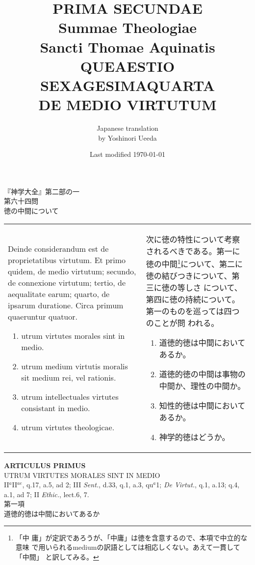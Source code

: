 \documentclass[10pt]{jsarticle}
\title{{\bf PRIMA SECUNDAE}\\{\HUGE Summae Theologiae}\\Sancti Thomae
Aquinatis\\{\sffamily QUEAESTIO SEXAGESIMAQUARTA}\\DE MEDIO VIRTUTUM}
\author{Japanese translation\\by Yoshinori {\sc Ueeda}}
\date{Last modified \today}
\begin{document}
\maketitle
\thispagestyle{empty}

\begin{center}
{\LARGE 『神学大全』第二部の一}\\
{\Large 第六十四問\\徳の中間について}
\end{center}

\begin{longtable}{p{21em}p{21em}}

Deinde considerandum est de proprietatibus virtutum. Et primo quidem,
de medio virtutum; secundo, de connexione virtutum; tertio, de
aequalitate earum; quarto, de ipsarum duratione. Circa primum
quaeruntur quatuor. 

\begin{enumerate}
 \item utrum virtutes morales sint in medio.
 \item utrum medium virtutis moralis sit medium rei, vel rationis.
 \item utrum intellectuales virtutes consistant in medio.
 \item utrum virtutes theologicae.
\end{enumerate}

&

次に徳の特性について考察されるべきである。第一に徳の中間\footnote{「中
 庸」が定訳であろうが、「中庸」は徳を含意するので、本項で中立的な意味
 で用いられるmediumの訳語としては相応しくない。あえて一貫して「中間」
 と訳してみる。}について、第二に徳の結びつきについて、第三に徳の等しさ
 について、第四に徳の持続について。第一のものを巡っては四つのことが問
 われる。

\begin{enumerate}
 \item 道徳的徳は中間においてあるか。
 \item 道徳的徳の中間は事物の中間か、理性の中間か。
 \item 知性的徳は中間においてあるか。
 \item 神学的徳はどうか。
\end{enumerate}
\end{longtable}

\newpage

\begin{center}
{\Large {\bf ARTICULUS PRIMUS}}\\
{\large UTRUM VIRTUTES MORALES SINT IN MEDIO}\\
{\footnotesize II$^{a}$II$^{ae}$, q.17, a.5, ad 2; III {\itshape Sent.}, d.33, q.1, a.3, qu$^{a}$1; {\itshape De Virtut.}, q.1, a.13; q.4, a.1, ad 7; II {\itshape Ethic.}, lect.6, 7.}\\
{\Large 第一項\\道徳的徳は中間においてあるか}
\end{center}
\end{document}
